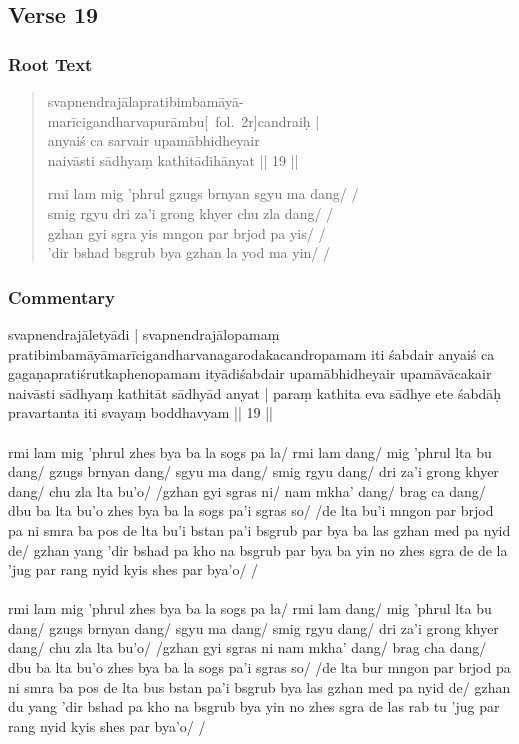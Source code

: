 \documentclass[12pt]{article}
\begin{document}
\subsection{Verse 19}
\subsubsection{Root Text}
\begin{quote}
	svapnendrajālapratibimbamāyā-\\
	marīcigandharvapurāmbu{[}\MS\ fol.\ 2r{]}candraiḥ |\\
	anyaiś ca sarvair upamābhidheyair \\
	naivāsti sādhyaṃ kathitādihānyat || 19 ||

	rmi lam mig 'phrul gzugs brnyan sgyu ma dang/ /\\
	smig rgyu dri za'i grong khyer chu zla dang/ /\\
	gzhan gyi sgra yis mngon par brjod pa yis/ /\\
	'dir bshad bsgrub bya gzhan la yod ma yin/ /
\end{quote}

\subsubsection{Commentary}
svapnendrajāletyādi | svapnendrajālopamaṃ pratibimbamāyāmarīcigandharvanagarodakacandropamam iti śabdair anyaiś ca gagaṇapratiśrutkaphenopamam ityādiśabdair upamābhidheyair upamāvācakair naivāsti sādhyaṃ kathitāt sādhyād anyat | paraṃ kathita eva sādhye ete śabdāḥ pravartanta iti svayaṃ boddhavyam || 19 ||\\

\textbf{\TVA}\\
rmi lam mig 'phrul zhes bya ba la sogs pa la/ rmi lam dang/ mig 'phrul lta bu dang/ gzugs brnyan dang/ sgyu ma dang/ smig rgyu dang/ dri za'i grong khyer dang/ chu zla lta bu'o/ /gzhan gyi sgras ni/ nam mkha' dang/ brag ca dang/ dbu ba lta bu'o zhes bya ba la sogs pa'i sgras so/ /de lta bu'i mngon par brjod pa ni smra ba pos de lta bu'i bstan pa'i bsgrub par bya ba las gzhan med pa nyid de/ gzhan yang 'dir bshad pa kho na bsgrub par bya ba yin no zhes sgra de de la 'jug par rang nyid kyis shes par bya'o/ /\\

\textbf{\TVB}\\
rmi lam mig 'phrul zhes bya ba la sogs pa la/ rmi lam dang/ mig 'phrul lta bu dang/ gzugs brnyan dang/ sgyu ma dang/ smig rgyu dang/ dri za'i grong khyer dang/ chu zla lta bu'o/ /gzhan gyi sgras ni nam mkha' dang/ brag cha dang/ dbu ba lta bu'o zhes bya ba la sogs pa'i sgras so/ /de lta bur mngon par brjod pa ni smra ba pos de lta bus bstan pa'i bsgrub bya las gzhan med pa nyid de/ gzhan du yang 'dir bshad pa kho na bsgrub bya yin no zhes sgra de las rab tu 'jug par rang nyid kyis shes par bya'o/ /
\end{document}
